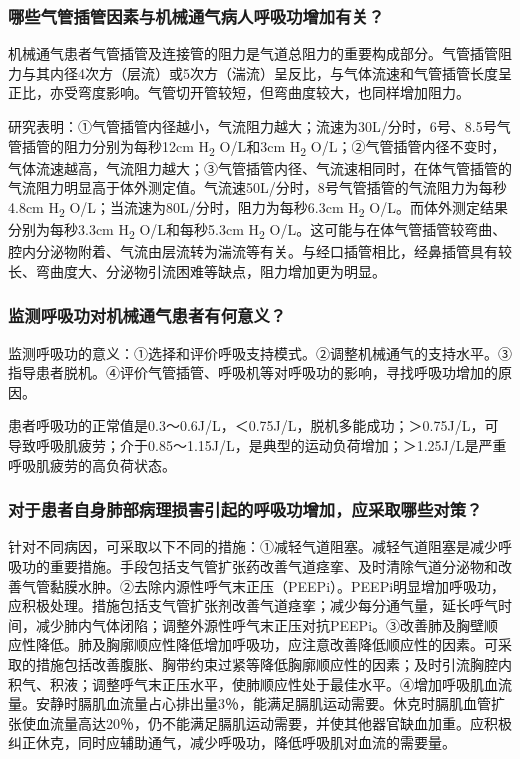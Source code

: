\subsubsection{哪些气管插管因素与机械通气病人呼吸功增加有关？}

机械通气患者气管插管及连接管的阻力是气道总阻力的重要构成部分。气管插管阻力与其内径4次方（层流）或5次方（湍流）呈反比，与气体流速和气管插管长度呈正比，亦受弯度影响。气管切开管较短，但弯曲度较大，也同样增加阻力。

研究表明：①气管插管内径越小，气流阻力越大；流速为30L/分时，6号、8.5号气管插管的阻力分别为每秒12cm
H\textsubscript{2} O/L和3cm H\textsubscript{2}
O/L；②气管插管内径不变时，气体流速越高，气流阻力越大；③气管插管内径、气流速相同时，在体气管插管的气流阻力明显高于体外测定值。气流速50L/分时，8号气管插管的气流阻力为每秒4.8cm
H\textsubscript{2} O/L；当流速为80L/分时，阻力为每秒6.3cm
H\textsubscript{2} O/L。而体外测定结果分别为每秒3.3cm H\textsubscript{2}
O/L和每秒5.3cm H\textsubscript{2}
O/L。这可能与在体气管插管较弯曲、腔内分泌物附着、气流由层流转为湍流等有关。与经口插管相比，经鼻插管具有较长、弯曲度大、分泌物引流困难等缺点，阻力增加更为明显。

\subsubsection{监测呼吸功对机械通气患者有何意义？}

监测呼吸功的意义：①选择和评价呼吸支持模式。②调整机械通气的支持水平。③指导患者脱机。④评价气管插管、呼吸机等对呼吸功的影响，寻找呼吸功增加的原因。

患者呼吸功的正常值是0.3～0.6J/L，＜0.75J/L，脱机多能成功；＞0.75J/L，可导致呼吸肌疲劳；介于0.85～1.15J/L，是典型的运动负荷增加；＞1.25J/L是严重呼吸肌疲劳的高负荷状态。

\subsubsection{对于患者自身肺部病理损害引起的呼吸功增加，应采取哪些对策？}

针对不同病因，可采取以下不同的措施：①减轻气道阻塞。减轻气道阻塞是减少呼吸功的重要措施。手段包括支气管扩张药改善气道痉挛、及时清除气道分泌物和改善气管黏膜水肿。②去除内源性呼气末正压（PEEPi）。PEEPi明显增加呼吸功，应积极处理。措施包括支气管扩张剂改善气道痉挛；减少每分通气量，延长呼气时间，减少肺内气体闭陷；调整外源性呼气末正压对抗PEEPi。③改善肺及胸壁顺应性降低。肺及胸廓顺应性降低增加呼吸功，应注意改善降低顺应性的因素。可采取的措施包括改善腹胀、胸带约束过紧等降低胸廓顺应性的因素；及时引流胸腔内积气、积液；调整呼气末正压水平，使肺顺应性处于最佳水平。④增加呼吸肌血流量。安静时膈肌血流量占心排出量3％，能满足膈肌运动需要。休克时膈肌血管扩张使血流量高达20％，仍不能满足膈肌运动需要，并使其他器官缺血加重。应积极纠正休克，同时应辅助通气，减少呼吸功，降低呼吸肌对血流的需要量。

